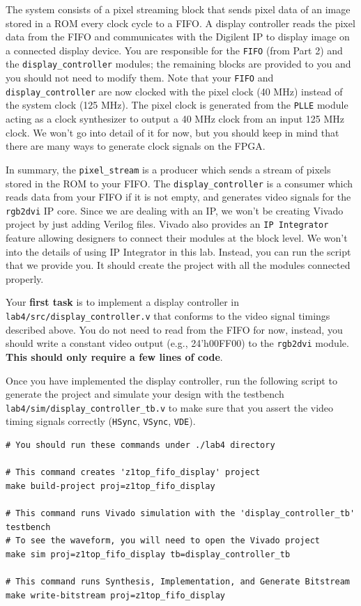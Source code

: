 \documentclass[11pt]{article}
\begin{document}
The system consists of a pixel streaming block that sends pixel data of an image stored in a ROM every clock cycle to a FIFO. A display controller reads the pixel data from the FIFO and communicates with the Digilent IP to display image on a connected display device. You are responsible for the \verb|FIFO| (from Part 2) and the \verb|display_controller| modules; the remaining blocks are provided to you and you should not need to modify them. Note that your \verb|FIFO| and \verb|display_controller| are now clocked with the pixel clock (40 MHz) instead of the system clock (125 MHz). The pixel clock is generated from the \verb|PLLE| module acting as a clock synthesizer to output a 40 MHz clock from an input 125 MHz clock. We won't go into detail of it for now, but you should keep in mind that there are many ways to generate clock signals on the FPGA.

In summary, the \verb|pixel_stream| is a producer which sends a stream of pixels stored in the ROM to your FIFO. The \verb|display_controller| is a consumer which reads data from your FIFO if it is not empty, and generates video signals for the \verb|rgb2dvi| IP core. Since we are dealing with an IP, we won't be creating Vivado project by just adding Verilog files. Vivado also provides an \texttt{IP Integrator} feature allowing designers to connect their modules at the block level. We won't into the details of using IP Integrator in this lab. Instead, you can run the script that we provide you. It should create the project with all the modules connected properly.

Your \textbf{first task} is to implement a display controller in \verb|lab4/src/display_controller.v| that conforms to the video signal timings described above. You do not need to read from the FIFO for now, instead, you should write a constant video output (e.g., 24'h00FF00) to the \verb|rgb2dvi| module. \textbf{This should only require a few lines of code}.

Once you have implemented the display controller, run the following script to generate the project and simulate your design with the testbench \verb|lab4/sim/display_controller_tb.v| to make sure that you assert the video timing signals correctly (\verb|HSync|, \verb|VSync|, \verb|VDE|).

\begin{verbatim}
# You should run these commands under ./lab4 directory

# This command creates 'z1top_fifo_display' project
make build-project proj=z1top_fifo_display

# This command runs Vivado simulation with the 'display_controller_tb' testbench
# To see the waveform, you will need to open the Vivado project
make sim proj=z1top_fifo_display tb=display_controller_tb

# This command runs Synthesis, Implementation, and Generate Bitstream
make write-bitstream proj=z1top_fifo_display
\end{verbatim}
\end{document}
